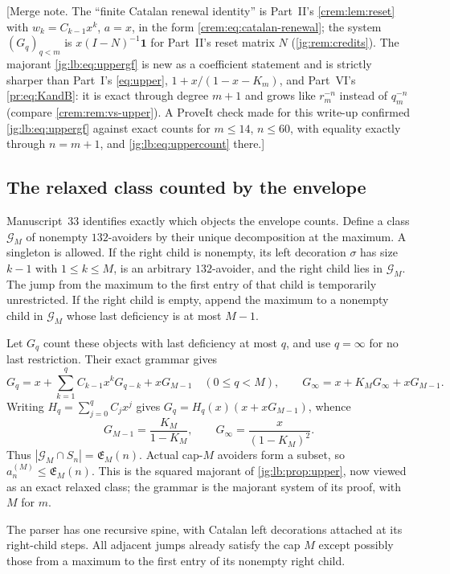 \documentclass[11pt,a4paper]{article}
\theoremstyle{definition}\newaliascnt{definition}{theorem}
\theoremstyle{remark}\newaliascnt{remark}{theorem}
\newcommand{\one}{\mathbf 1}
\begin{document}
[Merge note. The ``finite Catalan renewal identity'' is Part~II's
\cref{crem:lem:reset} with $w_k=C_{k-1}x^k$, $a=x$, in the form
\eqref{crem:eq:catalan-renewal}; the system $(G_q)_{q<m}$ is $x(I-N)^{-1}\one$
for Part~II's reset matrix $N$ (\cref{jg:rem:credits}). The majorant
\eqref{jg:lb:eq:uppergf} is new as a coefficient statement and is strictly
sharper than Part~I's \eqref{eq:upper}, $1+x/(1-x-K_m)$, and Part~VI's
\eqref{pr:eq:KandB}: it is exact through degree $m+1$ and grows like $r_m^{-n}$
instead of $q_m^{-n}$ (compare \cref{crem:rem:vs-upper}). A ProveIt check made
for this write-up confirmed \eqref{jg:lb:eq:uppergf} against exact counts for
$m\le14$, $n\le60$, with equality exactly through $n=m+1$, and
\eqref{jg:lb:eq:uppercount} there.]

\subsection{The relaxed class counted by the envelope}
\label{jg:sec:relaxed}
Manuscript~33 identifies exactly which objects the envelope counts. Define a
class $\mathcal G_M$ of nonempty $132$-avoiders by their unique decomposition
at the maximum. A singleton is allowed. If the right child is nonempty, its
left decoration $\sigma$ has size $k-1$ with $1\le k\le M$, is an arbitrary
$132$-avoider, and the right child lies in $\mathcal G_M$. The jump from the
maximum to the first entry of that child is temporarily unrestricted. If the
right child is empty, append the maximum to a nonempty child in $\mathcal G_M$
whose last deficiency is at most $M-1$.

Let $G_q$ count these objects with last deficiency at most $q$, and use
$q=\infty$ for no last restriction. Their exact grammar gives
\[
 G_q=x+\sum_{k=1}^q C_{k-1}x^kG_{q-k}+xG_{M-1}\quad(0\le q<M),
 \qquad G_\infty=x+K_MG_\infty+xG_{M-1}.
\]
Writing $H_q=\sum_{j=0}^q C_jx^j$ gives $G_q=H_q(x)(x+xG_{M-1})$, whence
\begin{equation}\label{jg:ra:eq:grammar}
 G_{M-1}=\frac{K_M}{1-K_M},\qquad
 G_\infty=\frac{x}{(1-K_M)^2}.
\end{equation}
Thus $|\mathcal G_M\cap S_n|=\mathfrak E_M(n)$. Actual cap-$M$ avoiders form a
subset, so $a_n^{(M)}\le\mathfrak E_M(n)$. This is the squared majorant of
\cref{jg:lb:prop:upper}, now viewed as an exact relaxed class; the grammar is
the majorant system of its proof, with $M$ for $m$.

The parser has one recursive spine, with Catalan left decorations attached at
its right-child steps. All adjacent jumps already satisfy the cap $M$ except
possibly those from a maximum to the first entry of its nonempty right child.
\end{document}
